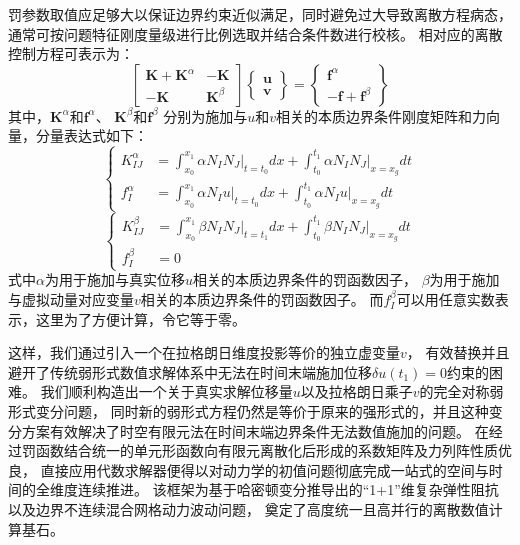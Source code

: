 罚参数取值应足够大以保证边界约束近似满足，同时避免过大导致离散方程病态，
通常可按问题特征刚度量级进行比例选取并结合条件数进行校核。
相对应的离散控制方程可表示为：
\begin{equation}\label{3.28}
\begin{bmatrix}
\boldsymbol K + \boldsymbol K^\alpha & -\boldsymbol K \\ -\boldsymbol K & \boldsymbol K^\beta
\end{bmatrix}
\begin{Bmatrix}
\boldsymbol u \\ \boldsymbol v
\end{Bmatrix} =
\begin{Bmatrix}
 \boldsymbol f^\alpha \\ -\boldsymbol f + \boldsymbol f^\beta
\end{Bmatrix}
\end{equation}
其中，$\boldsymbol K^\alpha$和$\boldsymbol f^\alpha$、
$\boldsymbol K^\beta$和$\boldsymbol f^\beta$
分别为施加与$u$和$v$相关的本质边界条件刚度矩阵和力向量，分量表达式如下：
\begin{equation}\label{3.29}
    \left \{
        \begin{aligned}
            K^\alpha_{IJ} &= \int_{x_0}^{x_1} \alpha N_I N_J \vert_{t=t_0} dx + \int_{t_0}^{t_1} \alpha N_I N_J \vert_{x=x_g} dt \\ 
            f^\alpha_{I}  &= \int_{x_0}^{x_1} \alpha N_I u \vert_{t=t_0} dx + \int_{t_0}^{t_1} \alpha N_I u\vert_{x=x_g} dt
        \end{aligned}
    \right .
\end{equation}
\begin{equation}\label{3.30}
    \left \{
        \begin{aligned}
            K^\beta_{IJ} &= \int_{x_0}^{x_1} \beta N_I N_J \vert_{t=t_1} dx + \int_{t_0}^{t_1} \beta N_I N_J \vert_{x=x_g} dt \\ 
            f^\beta_I &= 0
        \end{aligned}
    \right .
\end{equation}
式中$\alpha$为用于施加与真实位移$u$相关的本质边界条件的罚函数因子，
$\beta$为用于施加与虚拟动量对应变量$v$相关的本质边界条件的罚函数因子。
而$f^\beta_I$可以用任意实数表示，这里为了方便计算，令它等于零。

这样，我们通过引入一个在拉格朗日维度投影等价的独立虚变量$v$，
有效替换并且避开了传统弱形式数值求解体系中无法在时间末端施加位移$\delta u(t_1)=0$约束的困难。
我们顺利构造出一个关于真实求解位移量$u$以及拉格朗日乘子$v$的完全对称弱形式变分问题，
同时新的弱形式方程仍然是等价于原来的强形式的，并且这种变分方案有效解决了时空有限元法在时间末端边界条件无法数值施加的问题。
在经过罚函数结合统一的单元形函数向有限元离散化后形成的系数矩阵及力列阵性质优良，
直接应用代数求解器便得以对动力学的初值问题彻底完成一站式的空间与时间的全维度连续推进。
该框架为基于哈密顿变分推导出的“1+1”维复杂弹性阻抗以及边界不连续混合网格动力波动问题，
奠定了高度统一且高并行的离散数值计算基石。





